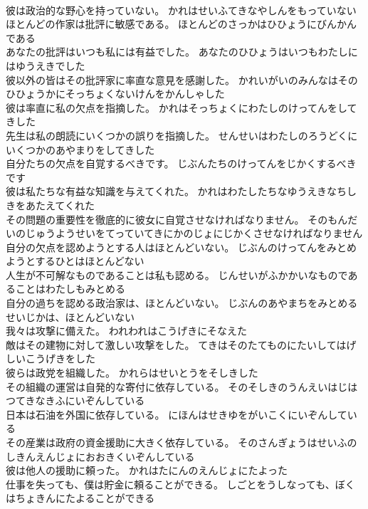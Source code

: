 \documentclass[8pt]{extreport}
\begin{document}
\begin{CJK}{UTF8}{min}
\\	彼は政治的な野心を持っていない。	かれはせいふてきなやしんをもっていない 
\\	ほとんどの作家は批評に敏感である。	ほとんどのさっかはひひょうにびんかんである 
\\	あなたの批評はいつも私には有益でした。	あなたのひひょうはいつもわたしにはゆうえきでした 
\\	彼以外の皆はその批評家に率直な意見を感謝した。	かれいがいのみんなはそのひひょうかにそっちょくないけんをかんしゃした 
\\	彼は率直に私の欠点を指摘した。	かれはそっちょくにわたしのけってんをしてきした 
\\	先生は私の朗読にいくつかの誤りを指摘した。	せんせいはわたしのろうどくにいくつかのあやまりをしてきした 
\\	自分たちの欠点を自覚するべきです。	じぶんたちのけってんをじかくするべきです 
\\	彼は私たちな有益な知識を与えてくれた。	かれはわたしたちなゆうえきなちしきをあたえてくれた 
\\	その問題の重要性を徹底的に彼女に自覚させなければなりません。	そのもんだいのじゅうようせいをてっていてきにかのじょにじかくさせなければなりません 
\\	自分の欠点を認めようとする人はほとんどいない。	じぶんのけってんをみとめようとするひとはほとんどない 
\\	人生が不可解なものであることは私も認める。	じんせいがふかかいなものであることはわたしもみとめる 
\\	自分の過ちを認める政治家は、ほとんどいない。	じぶんのあやまちをみとめるせいじかは、ほとんどいない 
\\	我々は攻撃に備えた。	われわれはこうげきにそなえた 
\\	敵はその建物に対して激しい攻撃をした。	てきはそのたてものにたいしてはげしいこうげきをした 
\\	彼らは政党を組織した。	かれらはせいとうをそしきした 
\\	その組織の運営は自発的な寄付に依存している。	そのそしきのうんえいはじはつてきなきふにいぞんしている 
\\	日本は石油を外国に依存している。	にほんはせきゆをがいこくにいぞんしている 
\\	その産業は政府の資金援助に大きく依存している。	そのさんぎょうはせいふのしきんえんじょにおおきくいぞんしている 
\\	彼は他人の援助に頼った。	かれはたにんのえんじょにたよった 
\\	仕事を失っても、僕は貯金に頼ることができる。	しごとをうしなっても、ぼくはちょきんにたよることができる 

\end{CJK}
\end{document}
